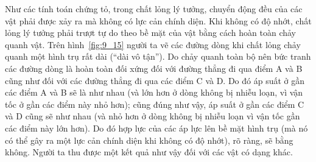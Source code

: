 
Như các tính toán chứng tỏ, trong chất lỏng lý tưởng, chuyển động đều của các vật phải được xảy ra mà không có lực cản chính diện. Khi không có độ nhớt, chất lỏng lý tưởng phải trượt tự do theo bề mặt của vật bằng cách hoàn toàn chảy quanh vật. Trên hình~\ref{fig:9_15} người ta vẽ các đường dòng khi chất lỏng chảy quanh một hình trụ rất dài (``dài vô tận''). Do chảy quanh toàn bộ nên bức tranh các đường dòng là hoàn toàn đối xứng đối với đường thẳng đi qua điểm A và B cũng như đối với các đường thẳng đi qua các điểm C và D. Do đó áp suất ở gần các điểm A và B sẽ là như nhau (và lớn hơn ở dòng không bị nhiễu loạn, vì vận tốc ở gần các điểm này nhỏ hơn); cũng đúng như vậy, áp suất ở gần các điểm C và D cũng sẽ như nhau (và nhỏ hơn ở dòng không bị nhiễu loạn vì vận tốc gần các điểm này lớn hơn). Do đó hợp lực của các áp lực lên bề mặt hình trụ (mà nó có thể gây ra một lực cản chính diện khi không có độ nhớt), rõ ràng, sẽ bằng không. Người ta thu được một kết quả như vậy đối với các vật có dạng khác.

